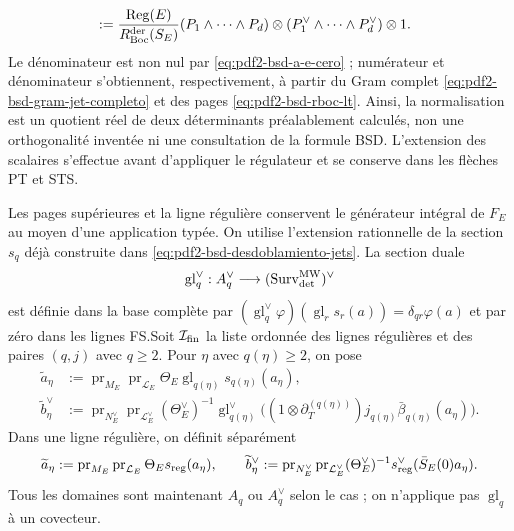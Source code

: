 \begin{proposition}
\begin{equation}
\begin{aligned}
 &:=\frac{\operatorname{Reg}(E)}{R_{\rm Boc}^{\rm der}(S_E)}
 (P_1\wedge\cdots\wedge P_d)
 \otimes(P_1^\vee\wedge\cdots\wedge P_d^\vee)\otimes1.
 \end{aligned}
\end{equation}
Le dénominateur est non nul par \eqref{eq:pdf2-bsd-a-e-cero} ; numérateur et
dénominateur s'obtiennent, respectivement, à partir du Gram complet
\eqref{eq:pdf2-bsd-gram-jet-completo} et des pages
\eqref{eq:pdf2-bsd-rboc-lt}. Ainsi, la normalisation est un quotient réel de deux
déterminants préalablement calculés, non une orthogonalité inventée ni une
consultation de la formule BSD. L'extension des scalaires s'effectue avant
d'appliquer le régulateur et se conserve dans les flèches PT et STS.

Les pages supérieures et la ligne régulière conservent le générateur intégral de
$F_E$ au moyen d'une application typée. On utilise l'extension rationnelle de la section
$s_q$ déjà construite dans \eqref{eq:pdf2-bsd-desdoblamiento-jets}. La section duale
\begin{equation}\label{eq:pdf2-bsd-glue-dual-tipado}
 \operatorname{gl}_q^\vee:A_q^\vee\longrightarrow
   (\operatorname{Surv}_{\rm det}^{\rm MW})^\vee
\end{equation}
est définie dans la base complète par
$(\operatorname{gl}_q^\vee\varphi)
(\operatorname{gl}_r s_r(a))=\delta_{qr}\varphi(a)$ et par zéro dans les lignes
FS.\@ Soit $\mathcal I_{\rm fin}$ la liste ordonnée des lignes régulières et des paires
$(q,j)$ avec $q\geq2$. Pour $\eta$ avec $q(\eta)\geq2$, on pose
\begin{equation}\label{eq:pdf2-bsd-lifts-filas-smith}
 \begin{aligned}
 \widetilde a_\eta&:=\operatorname{pr}_{M_E}\operatorname{pr}_{\mathcal L_E}
   \Theta_E\operatorname{gl}_{q(\eta)}s_{q(\eta)}(a_\eta),\\
 \widetilde b_\eta^\vee&:=
   \operatorname{pr}_{N_E^\vee}\operatorname{pr}_{\mathcal L_E^\vee}
   (\Theta_E^\vee)^{-1}\operatorname{gl}_{q(\eta)}^\vee
   \bigl((1\otimes\partial_T^{(q(\eta))})
      j_{q(\eta)}\bar\beta_{q(\eta)}(a_\eta)\bigr).
 \end{aligned}
\end{equation}
Dans une ligne régulière, on définit séparément
\begin{equation}\label{eq:pdf2-bsd-lifts-fila-regular}
 \widetilde a_\eta:=
 \operatorname{pr}_{M_E}\operatorname{pr}_{\mathcal L_E}
 \Theta_Es_{\rm reg}(a_\eta),
 \qquad
 \widetilde b_\eta^\vee:=
 \operatorname{pr}_{N_E^\vee}\operatorname{pr}_{\mathcal L_E^\vee}
 (\Theta_E^\vee)^{-1}s_{\rm reg}^\vee
 (\bar S_E(0)a_\eta).
\end{equation}
Tous les domaines sont maintenant $A_q$ ou $A_q^\vee$ selon le cas ; on
n'applique pas $\operatorname{gl}_q$ à un covecteur.


\end{proposition}
